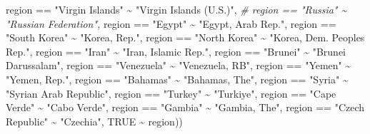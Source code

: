 \documentclass[
]{article}
\newenvironment{Shaded}{\begin{snugshade}}{\end{snugshade}}
\newcommand{\CommentTok}[1]{\textcolor[rgb]{0.56,0.35,0.01}{\textit{#1}}}
\newcommand{\ConstantTok}[1]{\textcolor[rgb]{0.00,0.00,0.00}{#1}}
\newcommand{\NormalTok}[1]{#1}
\newcommand{\SpecialCharTok}[1]{\textcolor[rgb]{0.00,0.00,0.00}{#1}}
\newcommand{\StringTok}[1]{\textcolor[rgb]{0.31,0.60,0.02}{#1}}
\begin{document}
\begin{Shaded}
\begin{Highlighting}[]
\NormalTok{                            region }\SpecialCharTok{==} \StringTok{"Virgin Islands"}  \SpecialCharTok{\textasciitilde{}} \StringTok{"Virgin Islands (U.S.)"}\NormalTok{, }
\CommentTok{\#                            region == "Russia" \textasciitilde{} "Russian Federation", }
\NormalTok{                            region }\SpecialCharTok{==} \StringTok{"Egypt"} \SpecialCharTok{\textasciitilde{}} \StringTok{"Egypt, Arab Rep."}\NormalTok{,}
\NormalTok{                            region }\SpecialCharTok{==} \StringTok{"South Korea"} \SpecialCharTok{\textasciitilde{}} \StringTok{"Korea, Rep."}\NormalTok{,}
\NormalTok{                            region }\SpecialCharTok{==} \StringTok{"North Korea"} \SpecialCharTok{\textasciitilde{}} \StringTok{"Korea, Dem. People\textquotesingle{}s Rep."}\NormalTok{,}
\NormalTok{                            region }\SpecialCharTok{==} \StringTok{"Iran"} \SpecialCharTok{\textasciitilde{}} \StringTok{"Iran, Islamic Rep."}\NormalTok{,}
\NormalTok{                            region }\SpecialCharTok{==} \StringTok{"Brunei"} \SpecialCharTok{\textasciitilde{}} \StringTok{"Brunei Darussalam"}\NormalTok{,}
\NormalTok{                            region }\SpecialCharTok{==} \StringTok{"Venezuela"} \SpecialCharTok{\textasciitilde{}} \StringTok{"Venezuela, RB"}\NormalTok{,}
\NormalTok{                            region }\SpecialCharTok{==} \StringTok{"Yemen"} \SpecialCharTok{\textasciitilde{}} \StringTok{"Yemen, Rep."}\NormalTok{,}
\NormalTok{                            region }\SpecialCharTok{==} \StringTok{"Bahamas"} \SpecialCharTok{\textasciitilde{}} \StringTok{"Bahamas, The"}\NormalTok{,}
\NormalTok{                            region }\SpecialCharTok{==} \StringTok{"Syria"} \SpecialCharTok{\textasciitilde{}} \StringTok{"Syrian Arab Republic"}\NormalTok{,}
\NormalTok{                            region }\SpecialCharTok{==} \StringTok{"Turkey"} \SpecialCharTok{\textasciitilde{}} \StringTok{"Turkiye"}\NormalTok{,}
\NormalTok{                            region }\SpecialCharTok{==} \StringTok{"Cape Verde"} \SpecialCharTok{\textasciitilde{}} \StringTok{"Cabo Verde"}\NormalTok{,}
\NormalTok{                            region }\SpecialCharTok{==} \StringTok{"Gambia"} \SpecialCharTok{\textasciitilde{}} \StringTok{"Gambia, The"}\NormalTok{,}
\NormalTok{                            region }\SpecialCharTok{==} \StringTok{"Czech Republic"} \SpecialCharTok{\textasciitilde{}} \StringTok{"Czechia"}\NormalTok{,}
                            \ConstantTok{TRUE} \SpecialCharTok{\textasciitilde{}}\NormalTok{ region))}
\end{Highlighting}
\end{Shaded}
\end{document}
